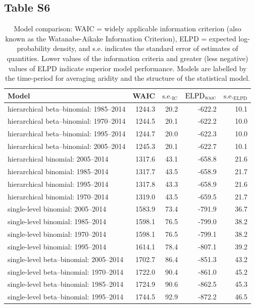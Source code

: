 \documentclass[draft]{agujournal}\usepackage{knitr}
\begin{document}
\subsection*{Table S6}
\begin{table}[H]
\centering
\begingroup\small
\begin{tabular}{p{3in}rrrr}
  \hline
Model & WAIC & $\text{s.e.}_{\text{IC}}$ & $\text{ELPD}_{\text{\scshape{waic}}}$ & $\text{s.e.}_{\text{ELPD}}$ \\ 
  \hline
hierarchical beta--binomial: 1985--2014 & 1244.3 & 20.2 & -622.2 & 10.1 \\ 
  hierarchical beta--binomial: 1970--2014 & 1244.5 & 20.1 & -622.2 & 10.0 \\ 
  hierarchical beta--binomial: 1995--2014 & 1244.7 & 20.0 & -622.3 & 10.0 \\ 
  hierarchical beta--binomial: 2005--2014 & 1245.3 & 20.1 & -622.7 & 10.1 \\ 
  hierarchical binomial: 2005--2014 & 1317.6 & 43.1 & -658.8 & 21.6 \\ 
  hierarchical binomial: 1985--2014 & 1317.7 & 43.5 & -658.9 & 21.7 \\ 
  hierarchical binomial: 1995--2014 & 1317.8 & 43.3 & -658.9 & 21.6 \\ 
  hierarchical binomial: 1970--2014 & 1319.0 & 43.5 & -659.5 & 21.7 \\ 
  single-level binomial: 2005--2014 & 1583.9 & 73.4 & -791.9 & 36.7 \\ 
  single-level binomial: 1985--2014 & 1598.1 & 76.5 & -799.0 & 38.2 \\ 
  single-level binomial: 1970--2014 & 1598.1 & 76.5 & -799.1 & 38.2 \\ 
  single-level binomial: 1995--2014 & 1614.1 & 78.4 & -807.1 & 39.2 \\ 
  single-level beta--binomial: 2005--2014 & 1702.7 & 86.4 & -851.3 & 43.2 \\ 
  single-level beta--binomial: 1970--2014 & 1722.0 & 90.4 & -861.0 & 45.2 \\ 
  single-level beta--binomial: 1985--2014 & 1724.9 & 90.6 & -862.5 & 45.3 \\ 
  single-level beta--binomial: 1995--2014 & 1744.5 & 92.9 & -872.2 & 46.5 \\ 
   \hline
\end{tabular}
\endgroup
\caption[Model comparison: WAIC (climatological interval).]{Model comparison: WAIC = widely applicable information criterion (also known as the Watanabe-Aikake Information Criterion), ELPD = expected log-probability density, and s.e. indicates the standard error of estimates of quantities. Lower values of the information criteria and greater (less negative) values of ELPD indicate superior model performance. Models are labelled by the time-period for averaging aridity and the structure of the statistical model.} 
\label{tab:waic.years}
\end{table}
\end{document}
